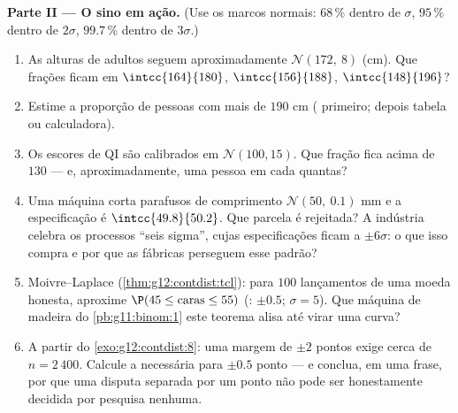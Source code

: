 \begin{problem}
\medskip
\noindent\textbf{Parte II --- O sino em ação.}
(Use os marcos normais: $68\,\%$ dentro de $\sigma$, $95\,\%$
dentro de $2\sigma$, $99.7\,\%$ dentro de $3\sigma$.)
\begin{enumerate}[resume]
  \item As alturas de adultos seguem aproximadamente
        $\mathcal N(172,\ 8)$ (cm). Que frações ficam em
        $\intcc{164}{180}$, $\intcc{156}{188}$,
        $\intcc{148}{196}$?
  \item Estime a proporção de pessoas com mais de $190$ cm
        ( primeiro; depois tabela ou calculadora).
  \item Os escores de QI são calibrados em
        $\mathcal N(100, 15)$. Que fração fica acima de $130$
        --- e, aproximadamente, uma pessoa em cada quantas?
  \item Uma máquina corta parafusos de comprimento
        $\mathcal N(50,\ 0.1)$ mm e a especificação é
        $\intcc{49.8}{50.2}$. Que parcela é rejeitada? A
        indústria celebra os processos ``seis sigma'', cujas
        especificações ficam a $\pm 6\sigma$: o que isso compra
        e por que as fábricas perseguem esse padrão?
  \item Moivre--Laplace (\cref{thm:g12:contdist:tcl}): para
        $100$ lançamentos de uma moeda honesta, aproxime
        $\P(45 \leq \text{caras} \leq 55)$ (:
        $\pm 0.5$; $\sigma = 5$). Que máquina de madeira do
        \cref{pb:g11:binom:1} este teorema alisa até virar uma
        curva?
  \item A partir do \cref{exo:g12:contdist:8}: uma margem de
        $\pm 2$ pontos exige cerca de $n = 2\,400$. Calcule a
         necessária para $\pm 0.5$ ponto --- e conclua,
        em uma frase, por que uma disputa separada por um ponto
        não pode ser honestamente decidida por pesquisa
        nenhuma.
\end{enumerate}


\end{problem}
